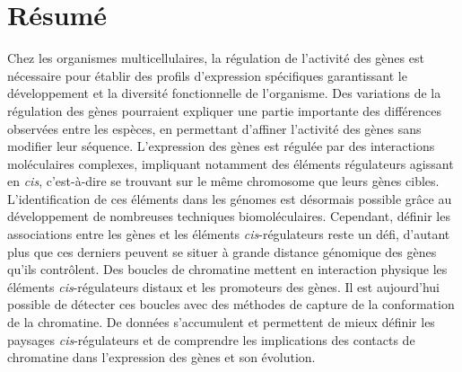\chapter*{Résumé}
\label{résumé}

Chez les organismes multicellulaires, la régulation de l'activité des gènes est nécessaire pour établir des profils d’expression spécifiques garantissant le développement et la diversité fonctionnelle de l’organisme. Des variations de la régulation des gènes pourraient expliquer une partie importante des différences observées entre les espèces, en permettant d’affiner l’activité des gènes sans modifier leur séquence. L’expression des gènes est régulée par des interactions moléculaires complexes, impliquant notamment des éléments régulateurs agissant en \textit{cis}, c’est-à-dire se trouvant sur le même chromosome que leurs gènes cibles. L’identification de ces éléments dans les génomes est désormais possible grâce au développement de nombreuses techniques biomoléculaires. Cependant, définir les associations entre les gènes et les éléments \textit{cis}-régulateurs reste un défi, d’autant plus que ces derniers peuvent se situer à grande distance génomique des gènes qu’ils contrôlent. Des boucles de chromatine mettent en interaction physique les éléments \textit{cis}-régulateurs distaux et les promoteurs des gènes. Il est aujourd’hui possible de détecter ces boucles avec des méthodes de capture de la conformation de la chromatine. De données s’accumulent et permettent de mieux définir les paysages \textit{cis}-régulateurs et de comprendre les implications des contacts de chromatine dans l’expression des gènes et son évolution.\\


